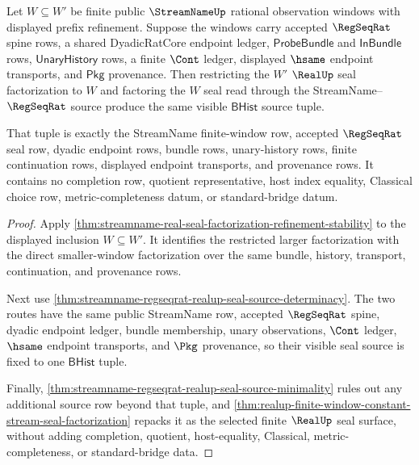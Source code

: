 \begin{theorem}
\label{thm:streamname-real-seal-factorization-diamond}
Let $W \subseteq W'$ be finite public $\StreamNameUp$ rational observation
windows with displayed prefix refinement. Suppose the windows carry accepted
$\RegSeqRat$ spine rows, a shared DyadicRatCore endpoint ledger,
$\mathsf{ProbeBundle}$ and $\mathsf{InBundle}$ rows, $\mathsf{UnaryHistory}$
rows, a finite $\Cont$ ledger, displayed $\hsame$ endpoint transports, and
$\mathsf{Pkg}$ provenance. Then restricting the $W'$ $\RealUp$ seal
factorization to $W$ and factoring the $W$ seal read through the
StreamName--$\RegSeqRat$ source produce the same visible $\mathsf{BHist}$
source tuple.

That tuple is exactly the StreamName finite-window row, accepted
$\RegSeqRat$ seal row, dyadic endpoint rows, bundle rows, unary-history rows,
finite continuation rows, displayed endpoint transports, and provenance rows.
It contains no completion row, quotient representative, host index equality,
Classical choice row, metric-completeness datum, or standard-bridge datum.
\end{theorem}
\begin{proof}
Apply
\autoref{thm:streamname-real-seal-factorization-refinement-stability} to the
displayed inclusion $W \subseteq W'$. It identifies the restricted larger
factorization with the direct smaller-window factorization over the same
bundle, history, transport, continuation, and provenance rows.

Next use
\autoref{thm:streamname-regseqrat-realup-seal-source-determinacy}. The two
routes have the same public StreamName row, accepted $\RegSeqRat$ spine,
dyadic endpoint ledger, bundle membership, unary observations, $\Cont$ ledger,
$\hsame$ endpoint transports, and $\Pkg$ provenance, so their visible seal
source is fixed to one $\mathsf{BHist}$ tuple.

Finally, \autoref{thm:streamname-regseqrat-realup-seal-source-minimality}
rules out any additional source row beyond that tuple, and
\autoref{thm:realup-finite-window-constant-stream-seal-factorization} repacks
it as the selected finite $\RealUp$ seal surface, without adding completion,
quotient, host-equality, Classical, metric-completeness, or standard-bridge
data.
\end{proof}

